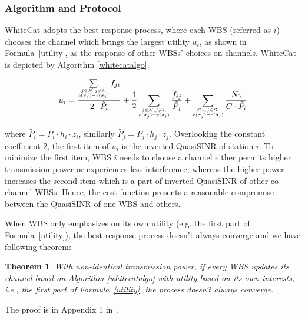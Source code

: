 \documentclass[times]{ettauth}
\newcommand{\ie}{i.e., }
\theoremstyle{mytheoremstyle}
\newtheorem{theorem}{Theorem}[section]
\theoremstyle{mytheoremstyle}
\theoremstyle{mytheoremstyle}
\begin{document}
\subsubsection{Algorithm and Protocol}
WhiteCat adopts the best response process, where each WBS (referred as $i$) chooses the channel which brings the largest utility $u_i$, as shown in Formula~\ref{utility}, as the response of other WBSs' choices on channels.
WhiteCat is depicted by Algorithm \ref{whitecatalgo}.

\begin{equation}
\label{utility}
u_i =\dfrac{\sum\limits_{\tiny\substack{j\in \mathcal{N}, j\ne i,\\ c(\sigma_j)=c(\sigma_i)}}f_{ji}}{2\cdot \tilde{P_i}} + \dfrac{1}{2}\sum_{\tiny\substack{j\in \mathcal{N}, j\ne i,\\ c(\sigma_j)=c(\sigma_i)}}\dfrac{f_{ij}}{\tilde{P_j}} + \sum_{\tiny\substack{\mathcal{S}:i,j\in \mathcal{S},\\ c(\sigma_j)=c(\sigma_i)}}\dfrac{N_0}{C\cdot \tilde{P_i}}\\
\end{equation}

where $\tilde{P_i} = P_i\cdot h_i\cdot z_i$, similarly $\tilde{P_j} = P_j\cdot h_j\cdot z_j$.
Overlooking the constant coefficient 2, the first item of $u_i$ is the inverted QuasiSINR of station $i$. 
To minimize the first item, WBS $i$ needs to choose a channel either permits higher transmission power or experiences less interference, whereas the higher power increases the second item which is a part of inverted QuasiSINR of other co-channel WBSs. 
Hence, the cost function presents a reasonable compromise between the QuasiSINR of one WBS and others.

When WBS only emphasizes on its own utility (e.g. the first part of Formula~\ref{utility}), the best response process doesn't always converge and we have following theorem:
\begin{theorem}
\label{noconvergence}
\emph{With non-identical transmission power, if every WBS updates its channel based on Algorithm \ref{whitecatalgo} with utility based on its own interests, \ie the first part of Formula~\ref{utility}, the process doesn't always converge.}
\end{theorem}
The proof is in Appendix 1 in~\cite{Li2012DistributedTS}.
\end{document}
